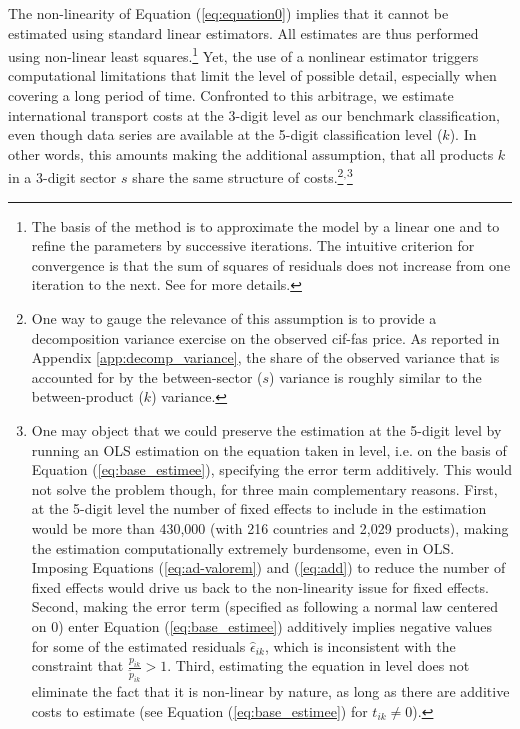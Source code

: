 \documentclass[a4paper,11pt]{article}
\begin{document}
The non-linearity of Equation (\ref{eq:equation0}) implies that it cannot be estimated using standard linear estimators. All estimates are thus performed using non-linear least squares.\footnote{The basis of the method is to approximate the model by a linear one and to refine the parameters by successive iterations. The intuitive criterion for convergence is that the sum of squares of residuals does not increase from one iteration to the next. See \cite{Woolridge-Book-2001} for more details.} Yet, the use of a nonlinear estimator triggers computational limitations that limit the level of possible detail, especially when covering a long period of time. Confronted to this arbitrage, we estimate international transport costs at the 3-digit level as our benchmark classification, even though data series are available at the 5-digit classification level ($k$). In other words, this amounts making the additional assumption, that all products $k$ in a 3-digit sector $s$ share the
same structure of costs.\footnote{One way to gauge the relevance of this assumption is to provide a decomposition variance exercise on the observed cif-fas price. As reported in Appendix \ref{app:decomp_variance}, the share of the observed variance that is accounted for by the between-sector ($s$) variance is roughly similar to the between-product ($k$) variance.}$^{,}$\footnote{One may object that we could preserve the estimation at the 5-digit level by running an OLS estimation on the equation taken in level, i.e. on the basis of Equation (\ref{eq:base_estimee}), specifying the error term additively. This would not solve the problem though, for three main complementary reasons. First, at the 5-digit level the number of fixed effects to include in the estimation would be more than 430,000 (with 216 countries and 2,029 products), making the estimation computationally extremely burdensome, even in OLS. Imposing Equations (\ref{eq:ad-valorem}) and (\ref{eq:add}) to reduce the number of fixed effects would drive us back to the non-linearity issue for fixed effects. Second, making the error term (specified as following a normal law centered on 0) enter Equation (\ref{eq:base_estimee}) additively implies negative values for some of the estimated residuals $\widehat{\epsilon}_{ik}$, which is inconsistent with the constraint that $\frac{p_{ik}}{\widetilde{p}_{ik}}>1$. Third, estimating the equation in level does not eliminate the fact that it is non-linear by nature, as long as there are additive costs to estimate (see Equation (\ref{eq:base_estimee}) for $t_{ik} \neq 0$).}
\end{document}

